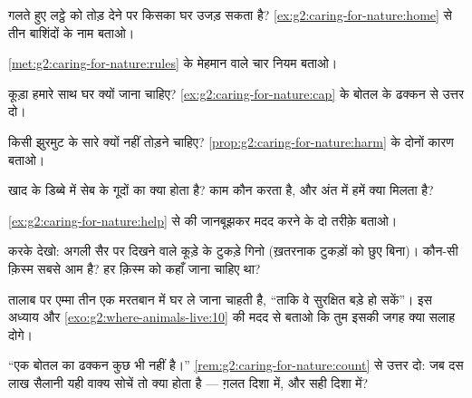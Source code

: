 \begin{exercise}[$\star$]\label{exo:g2:caring-for-nature:2}
गलते हुए लट्ठे को तोड़ देने पर किसका घर उजड़ सकता है?
\cref{ex:g2:caring-for-nature:home} से तीन बाशिंदों के नाम बताओ।
\end{exercise}

\begin{exercise}[$\star$]\label{exo:g2:caring-for-nature:3}
\cref{met:g2:caring-for-nature:rules} के मेहमान वाले चार नियम बताओ।
\end{exercise}

\begin{exercise}[$\star$]\label{exo:g2:caring-for-nature:4}
कूड़ा हमारे साथ घर क्यों जाना चाहिए?
\cref{ex:g2:caring-for-nature:cap} के बोतल के ढक्कन से उत्तर दो।
\end{exercise}

\begin{exercise}[$\star$]\label{exo:g2:caring-for-nature:5}
किसी झुरमुट के सारे  क्यों नहीं तोड़ने चाहिए?
\cref{prop:g2:caring-for-nature:harm} के दोनों कारण बताओ।
\end{exercise}

\begin{exercise}[$\star$]\label{exo:g2:caring-for-nature:6}
खाद के डिब्बे में सेब के गूदों का क्या होता है? काम कौन करता है, और
अंत में हमें क्या मिलता है?
\end{exercise}

\begin{exercise}[$\star$]\label{exo:g2:caring-for-nature:7}
\cref{ex:g2:caring-for-nature:help} से  की जानबूझकर मदद करने
के दो तरीक़े बताओ।
\end{exercise}

\begin{exercise}[$\star$]\label{exo:g2:caring-for-nature:8}
करके देखो: अगली सैर पर दिखने वाले कूड़े के टुकड़े गिनो (ख़तरनाक टुकड़ों
को छुए बिना)। कौन-सी क़िस्म सबसे आम है? हर क़िस्म को कहाँ जाना चाहिए
था?
\end{exercise}

\begin{exercise}[$\star\star$]\label{exo:g2:caring-for-nature:9}
तालाब पर एम्मा तीन  एक मरतबान में घर ले जाना चाहती है, ``ताकि वे
सुरक्षित बड़े हो सकें''। इस अध्याय और \cref{exo:g2:where-animals-live:10}
की मदद से बताओ कि तुम इसकी जगह क्या सलाह दोगे।
\end{exercise}

\begin{exercise}[$\star\star$]\label{exo:g2:caring-for-nature:10}
``एक बोतल का ढक्कन कुछ भी नहीं है।''
\cref{rem:g2:caring-for-nature:count} से उत्तर दो: जब दस लाख सैलानी
यही वाक्य सोचें तो क्या होता है --- ग़लत दिशा में, और सही दिशा में?
\end{exercise}
